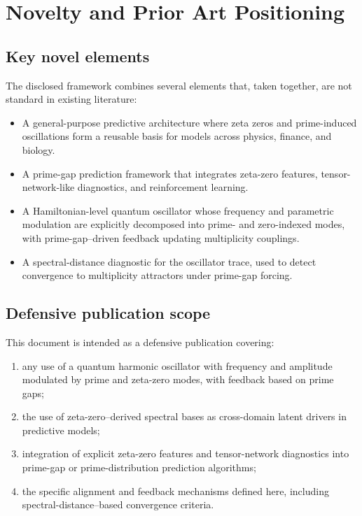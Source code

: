 \documentclass[11pt]{article}
\begin{document}
\section{Novelty and Prior Art Positioning}

\subsection{Key novel elements}

The disclosed framework combines several elements that, taken together, are not standard in existing literature:

\begin{itemize}[nosep]
    \item A general-purpose predictive architecture where zeta zeros and prime-induced oscillations form a reusable basis for models across physics, finance, and biology.\cite{file1}
    \item A prime-gap prediction framework that integrates zeta-zero features, tensor-network-like diagnostics, and reinforcement learning.\cite{file2}
    \item A Hamiltonian-level quantum oscillator whose frequency and parametric modulation are explicitly decomposed into prime- and zero-indexed modes, with prime-gap–driven feedback updating multiplicity couplings.\cite{file3}
    \item A spectral-distance diagnostic for the oscillator trace, used to detect convergence to multiplicity attractors under prime-gap forcing.
\end{itemize}

\subsection{Defensive publication scope}

This document is intended as a defensive publication covering:
\begin{enumerate}[nosep,label=(\alph*)]
    \item any use of a quantum harmonic oscillator with frequency and amplitude modulated by prime and zeta-zero modes, with feedback based on prime gaps;
    \item the use of zeta-zero–derived spectral bases as cross-domain latent drivers in predictive models;
    \item integration of explicit zeta-zero features and tensor-network diagnostics into prime-gap or prime-distribution prediction algorithms;
    \item the specific alignment and feedback mechanisms defined here, including spectral-distance–based convergence criteria.
\end{enumerate}
\end{document}
